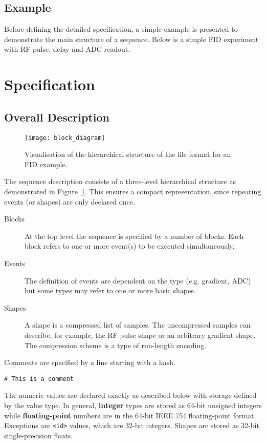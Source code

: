 \documentclass{article}
\begin{document}
\subsection{Example}

Before defining the detailed specification, a simple example is presented to demonstrate the main structure of a sequence. Below is a simple FID experiment with RF pulse, delay and ADC readout. 




\section{Specification}\label{sec:specification}

\subsection{Overall Description}

\begin{figure}[H]
\texttt{[image: block\_diagram]}
\caption{Visualisation of the hierarchical structure of the file format for an FID example. \label{fig:block_diagram}}
\end{figure}

The sequence description consists of a three-level hierarchical structure as demonstrated in Figure~\ref{fig:block_diagram}. This ensures a compact representation, since repeating events (or shapes) are only declared once.
\begin{description}
\item[Blocks] At the top level the sequence is specified by a number of blocks. Each block refers to one or more event(s) to be executed simultaneously.
\item[Events] The definition of events are dependent on the type (e.g. gradient, ADC) but some types may refer to one or more basic shapes.
\item[Shapes] A shape is a compressed list of samples. The uncompressed samples can describe, for example, the RF pulse shape or an arbitrary gradient shape. The compression scheme is a type of run-length encoding.
\end{description}

Comments are specified by a line starting with a hash.
\begin{lstlisting}
# This is a comment
\end{lstlisting}

The numeric values are declared exactly as described below with storage defined by the value type. In general, \textbf{integer} types are stored as 64-bit unsigned integers while \textbf{floating-point} numbers are in the 64-bit IEEE 754 floating-point format. Exceptions are \verb.<id>. values, which are 32-bit integers. Shapes are stored as 32-bit single-precision floats.
\end{document}
